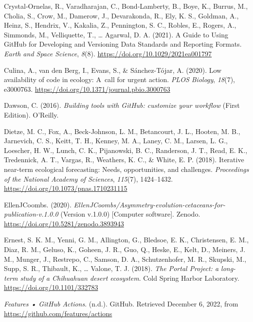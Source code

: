 \begin{CSLReferences}{1}{0}
\leavevmode{}%
Crystal‐Ornelas, R., Varadharajan, C., Bond‐Lamberty, B., Boye, K., Burrus, M., Cholia, S., Crow, M., Damerow, J., Devarakonda, R., Ely, K. S., Goldman, A., Heinz, S., Hendrix, V., Kakalia, Z., Pennington, S. C., Robles, E., Rogers, A., Simmonds, M., Velliquette, T., \ldots{} Agarwal, D. A. (2021). A Guide to Using GitHub for Developing and Versioning Data Standards and Reporting Formats. \emph{Earth and Space Science}, \emph{8}(8). \url{https://doi.org/10.1029/2021ea001797}

\leavevmode{}%
Culina, A., van den Berg, I., Evans, S., \& Sánchez-Tójar, A. (2020). Low availability of code in ecology: A~call for urgent action. \emph{PLOS Biology}, \emph{18}(7), e3000763. \url{https://doi.org/10.1371/journal.pbio.3000763}

\leavevmode{}%
Dawson, C. (2016). \emph{Building tools with GitHub: customize your workflow} (First Edition). O'Reilly.

\leavevmode{}%
Dietze, M. C., Fox, A., Beck-Johnson, L. M., Betancourt, J. L., Hooten, M. B., Jarnevich, C. S., Keitt, T. H., Kenney, M. A., Laney, C. M., Larsen, L. G., Loescher, H. W., Lunch, C. K., Pijanowski, B. C., Randerson, J. T., Read, E. K., Tredennick, A. T., Vargas, R., Weathers, K. C., \& White, E. P. (2018). Iterative near-term ecological forecasting: Needs, opportunities, and challenges. \emph{Proceedings of the National Academy of Sciences}, \emph{115}(7), 1424--1432. \url{https://doi.org/10.1073/pnas.1710231115}

\leavevmode{}%
EllenJCoombs. (2020). \emph{EllenJCoombs/Asymmetry-evolution-cetaceans-for-publication-v.1.0.0} (Version v.1.0.0) {[}Computer software{]}. Zenodo. \url{https://doi.org/10.5281/zenodo.3893943}

\leavevmode{}%
Ernest, S. K. M., Yenni, G. M., Allington, G., Bledsoe, E. K., Christensen, E. M., Diaz, R. M., Geluso, K., Goheen, J. R., Guo, Q., Heske, E., Kelt, D., Meiners, J. M., Munger, J., Restrepo, C., Samson, D. A., Schutzenhofer, M. R., Skupski, M., Supp, S. R., Thibault, K., \ldots{} Valone, T. J. (2018). \emph{The Portal Project: a long-term study of a Chihuahuan desert ecosystem}. Cold Spring Harbor Laboratory. \url{https://doi.org/10.1101/332783}

\leavevmode{}%
\emph{Features • GitHub Actions}. (n.d.). GitHub. Retrieved December 6, 2022, from \url{https://github.com/features/actions}


\end{CSLReferences}
